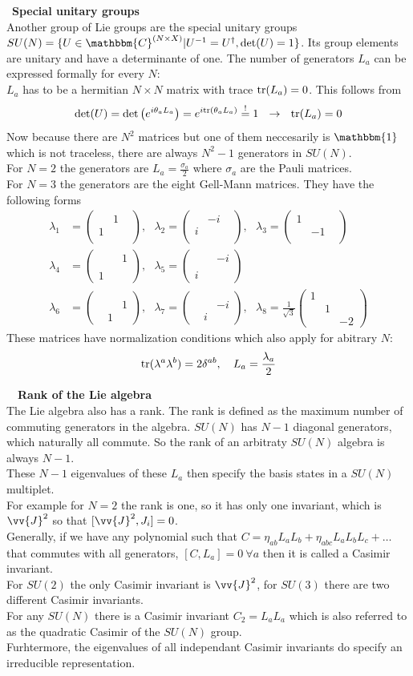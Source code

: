 \documentclass{include/thesisclass}
\newcommand{\df}{\rightarrow}
\newcommand{\ehm}{\mathbbm{1}}
\newcommand{\soll}{\overset{!}{=}}
\newcommand{\Mat}[9]{\begin{pmatrix}#1&#2&#3\\#4&#5&#6\\#7&#8&#9\end{pmatrix}}
\newcommand{\sub}[1]{~\newline\newline\textbf{#1}\\}
\newcommand{\tr}{{\rm tr}}
\begin{document}
\sub{Special unitary groups}
Another group of Lie groups are the special unitary groups $SU(N) = \{ U \in\mathbbm{C}^{(N\times X)} | U^{-1} = U^\dagger, \det(U) = 1\}$. Its group elements are unitary and have a determinante of one. The number of generators $L_a$ can be expressed formally for every $N$:\\
$L_a$ has to be a hermitian $N\times N$ matrix with trace $\tr(L_a) = 0$. This follows from
\[ \det(U) = \det \left( e^{i \theta_a L_a}\right) = e^{i \tr(\theta_a L_a)} \soll 1 ~~\df ~~ \tr(L_a) = 0\]
Now because there are $N^2$ matrices but one of them neccesarily is $\ehm$ which is not traceless, there are always $N^2-1$ generators in $SU(N)$.\\
For $N = 2$ the generators are $L_a = \frac{\sigma_a}{2}$ where $\sigma_a$ are the Pauli matrices.\\
For $N = 3$ the generators are the eight Gell-Mann matrices. They have the following forms
\begin{align*} \lambda_1 &= \Mat{}{1}{}{1}{}{}{}{}{},~~~\lambda_2 = \Mat{}{-i}{}{i}{}{}{}{}{},~~~\lambda_3 = \Mat{1}{}{}{}{-1}{}{}{}{}\\
\lambda_4 &= \Mat{}{}{1}{}{}{}{1}{}{}, ~~~\lambda_5 = \Mat{}{}{-i}{}{}{}{i}{}{}\\
\lambda_6 &= \Mat{}{}{}{}{}{1}{}{1}{}, ~~~\lambda_7 = \Mat{}{}{}{}{}{-i}{}{i}{}, ~~~\lambda_8 = \frac{1}{\sqrt{3}} \Mat{1}{}{}{}{1}{}{}{}{-2}
\end{align*}
These matrices have normalization conditions which also apply for abitrary $N$:
\[ \tr(\lambda^a \lambda^b) = 2\delta^{ab}, ~~~ L_a = \frac{\lambda_a}{2}\]


~\newline\newline\sub{Rank of the Lie algebra}
The Lie algebra also has a rank. The rank is defined as the maximum number of commuting generators in the algebra. $SU(N)$ has $N-1$ diagonal generators, which naturally all commute. So the rank of an arbitraty $SU(N)$ algebra is always $N-1$.\\
These $N-1$ eigenvalues of these $L_a$ then specify the basis states in a $SU(N)$ multiplet.\\
For example for $N = 2$ the rank is one, so it has only one invariant, which is $\vv{J}^2$ so that $[\vv{J}^2, J_i] = 0$.\\
Generally, if we have any polynomial such that $C = \eta_{ab} L_a L_b + \eta_{abc} L_aL_bL_c + \ldots$ that commutes with all generators, $[C,L_a] = 0 ~\forall a$ then it is called a Casimir invariant.\\
For $SU(2)$ the only Casimir invariant is $\vv{J}^2$, for $SU(3)$ there are two different Casimir invariants.\\
For any $SU(N)$ there is a Casimir invariant $C_2 = L_aL_a$ which is also referred to as the quadratic Casimir of the $SU(N)$ group.\\
Furhtermore, the eigenvalues of all independant Casimir invariants do specify an irreducible representation.
\end{document}
